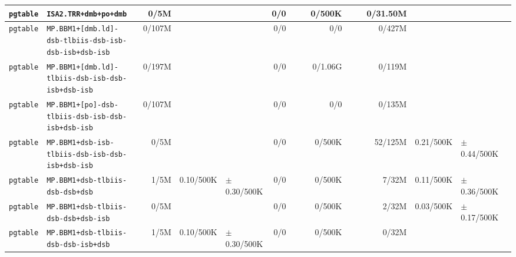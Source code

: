 \begin{tabular}{l l  | r r l | r r l | r r l | r r l l}
        \verb|pgtable| &                                 \verb|ISA2.TRR+dmb+po+dmb| &           0/5M &                       &                   &            0/0 &                       &  &         0/500K &                       &                   &       0/31.50M &                       &                   & \\ \hline 
        \verb|pgtable| & \verb|MP.BBM1+[dmb.ld]-dsb-tlbiis-dsb-isb-dsb-isb+dsb-isb| &         0/107M &                       &                   &            0/0 &                       &  &            0/0 &                       &                   &         0/427M &                       &                   & \\ \hline 
        \verb|pgtable| &     \verb|MP.BBM1+[dmb.ld]-tlbiis-dsb-isb-dsb-isb+dsb-isb| &         0/197M &                       &                   &            0/0 &                       &  &        0/1.06G &                       &                   &         0/119M &                       &                   & \\ \hline 
        \verb|pgtable| &     \verb|MP.BBM1+[po]-dsb-tlbiis-dsb-isb-dsb-isb+dsb-isb| &         0/107M &                       &                   &            0/0 &                       &  &            0/0 &                       &                   &         0/135M &                       &                   & \\ \hline 
        \verb|pgtable| &      \verb|MP.BBM1+dsb-isb-tlbiis-dsb-isb-dsb-isb+dsb-isb| &           0/5M &                       &                   &            0/0 &                       &  &         0/500K &                       &                   &        52/125M &             0.21/500K &   $\pm$ 0.44/500K & \\ \hline 
        \verb|pgtable| &                      \verb|MP.BBM1+dsb-tlbiis-dsb-dsb+dsb| &           1/5M &             0.10/500K &   $\pm$ 0.30/500K &            0/0 &                       &  &         0/500K &                       &                   &          7/32M &             0.11/500K &   $\pm$ 0.36/500K & \\ \hline 
        \verb|pgtable| &                  \verb|MP.BBM1+dsb-tlbiis-dsb-dsb+dsb-isb| &           0/5M &                       &                   &            0/0 &                       &  &         0/500K &                       &                   &          2/32M &             0.03/500K &   $\pm$ 0.17/500K & \\ \hline 
        \verb|pgtable| &                  \verb|MP.BBM1+dsb-tlbiis-dsb-dsb-isb+dsb| &           1/5M &             0.10/500K &   $\pm$ 0.30/500K &            0/0 &                       &  &         0/500K &                       &                   &          0/32M &                       &                   & \\ \hline 

\end{tabular}
